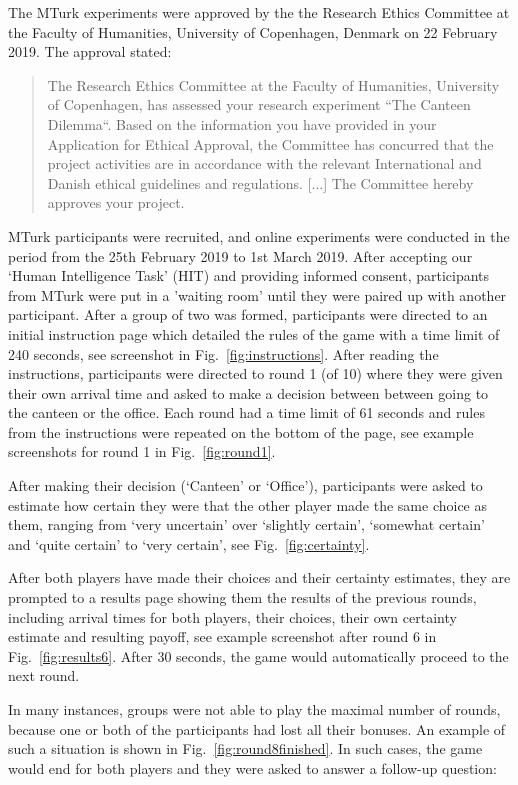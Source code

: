 \documentclass[a4paper,superscriptaddress,nofootinbib]{revtex4}
\begin{document}
The MTurk experiments were approved by the the Research Ethics Committee at the Faculty of Humanities, University of
Copenhagen, Denmark on 22 February 2019. The approval stated: 
\begin{quote} 
The Research Ethics Committee at the Faculty of Humanities, University of
Copenhagen, has assessed your research experiment “The Canteen Dilemma“. Based
on the information you have provided in your Application for Ethical Approval, the
Committee has concurred that the project activities are in accordance with the relevant
International and Danish ethical guidelines and regulations. [...] The Committee hereby approves your project.
\end{quote} 
MTurk participants were recruited, and online experiments were conducted in the period from the 25th February 2019 to 1st March 2019. After accepting
our `Human Intelligence Task' (HIT) and providing informed consent, participants from MTurk were put in a ’waiting room’ until they were paired up with another participant. After a group of two was formed, participants were directed to an initial instruction page which detailed the rules of the game with a time limit of 240 seconds, see screenshot in Fig.~\ref{fig:instructions}.
After reading the instructions, participants were directed to round 1 (of 10) where they were given their own arrival time and asked to make a decision between between going to the canteen or the office. Each round had a time limit of 61 seconds and rules from the instructions were repeated on the bottom of the page, see example screenshots for round 1 in Fig.~\ref{fig:round1}.

After making their decision (`Canteen' or `Office'), participants were asked to estimate how certain they were that the other player made the same choice as them, ranging from `very uncertain' over `slightly certain', `somewhat certain' and `quite certain' to `very certain', see Fig.~\ref{fig:certainty}.

After both players have made their choices and their certainty estimates, they are prompted to a results page showing them the results of the previous rounds, including arrival times for both players, their choices, their own certainty estimate and resulting payoff, see example screenshot after round 6 in Fig.~\ref{fig:results6}. After 30 seconds, the game would automatically proceed to the next round.

In many instances, groups were not able to play the maximal number of rounds, because one or both of the participants had lost all their bonuses. An example of such a situation is shown in Fig.~\ref{fig:round8finished}. In such cases, the game would end for both players and they were asked to answer a follow-up question: 
\end{document}
